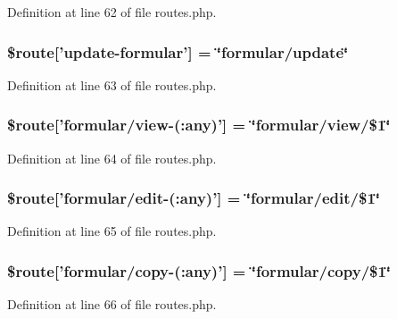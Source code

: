 Definition at line 62 of file routes.\-php.

\subsubsection[{\$route}]{\setlength{\rightskip}{0pt plus 5cm}\$route['update-\/formular'] = \char`\"{}formular/update\char`\"{}}\label{routes_8php_a15bdd3d189063146001dbf6d24700221}


Definition at line 63 of file routes.\-php.

\subsubsection[{\$route}]{\setlength{\rightskip}{0pt plus 5cm}\$route['formular/view-\/(\-:any)'] = \char`\"{}formular/view/\$1\char`\"{}}\label{routes_8php_a0e749412e2f26f650e9153df14585d38}


Definition at line 64 of file routes.\-php.

\subsubsection[{\$route}]{\setlength{\rightskip}{0pt plus 5cm}\$route['formular/edit-\/(\-:any)'] = \char`\"{}formular/edit/\$1\char`\"{}}\label{routes_8php_a34f30a10e7ae0647da591556346cccc0}


Definition at line 65 of file routes.\-php.

\subsubsection[{\$route}]{\setlength{\rightskip}{0pt plus 5cm}\$route['formular/copy-\/(\-:any)'] = \char`\"{}formular/copy/\$1\char`\"{}}\label{routes_8php_a8c14dc806faab68928fc37976a78e078}


Definition at line 66 of file routes.\-php.

